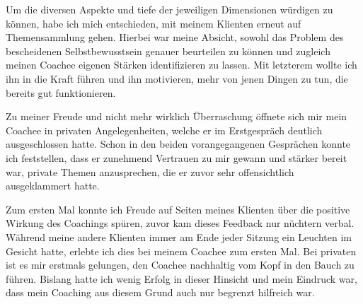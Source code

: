 \documentclass[11pt,a4paper]{article}
\begin{document}
Um die diversen Aspekte und tiefe der jeweiligen Dimensionen würdigen zu können, habe ich mich entschieden, mit meinem Klienten erneut auf Themensammlung gehen. Hierbei war meine Absicht, sowohl das Problem des bescheidenen Selbstbewusstsein genauer beurteilen zu können und zugleich meinen Coachee eigenen Stärken identifizieren zu lassen. Mit letzterem wollte ich ihn in die Kraft führen und ihn motivieren, mehr von jenen Dingen zu tun, die bereits gut funktionieren. 

Zu meiner Freude und nicht mehr wirklich Überraschung öffnete sich mir mein Coachee in privaten Angelegenheiten, welche er im Erstgespräch deutlich ausgeschlossen hatte. Schon in den beiden vorangegangenen Gesprächen konnte ich feststellen, dass er zunehmend Vertrauen zu mir gewann und stärker bereit war, private Themen anzusprechen, die er zuvor sehr offensichtlich ausgeklammert hatte.


Zum ersten Mal konnte ich Freude auf Seiten meines Klienten über die positive Wirkung des Coachings spüren, zuvor kam dieses Feedback nur nüchtern verbal. Während meine andere Klienten immer am Ende jeder Sitzung ein Leuchten im Gesicht hatte, erlebte ich dies bei meinem Coachee zum ersten Mal. Bei privaten ist es mir erstmals gelungen, den Coachee nachhaltig vom Kopf in den Bauch zu führen. Bislang hatte ich wenig Erfolg in dieser Hinsicht und mein Eindruck war, dass mein Coaching aus diesem Grund auch nur begrenzt hilfreich war.
\end{document}
